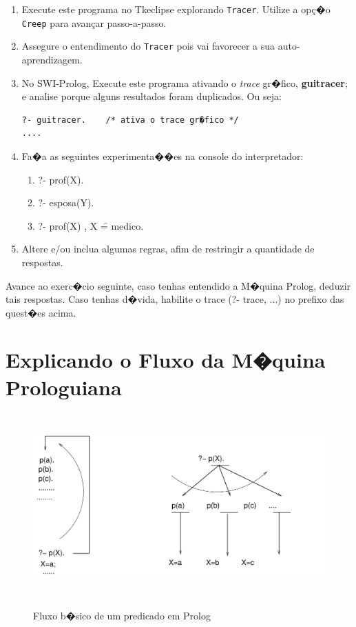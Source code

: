 \documentclass[final,a4paper]{article}
\begin{document}
\begin{enumerate}

\item Execute este programa no Tkeclipse explorando 
\texttt{Tracer}. Utilize a op\c{c}�o \texttt{Creep}
para avan\c{c}ar passo-a-passo.

\item Assegure o entendimento do \texttt{Tracer} pois
vai favorecer a sua auto-aprendizagem.

\item No SWI-Prolog, Execute este programa ativando
o {\em trace} gr�fico, {\bf guitracer}; e analise
porque alguns resultados foram duplicados.
Ou seja:
\begin{verbatim}
?- guitracer.    /* ativa o trace gr�fico */
....
\end{verbatim}

\item Fa�a as seguintes experimenta��es na
console do interpretador:
\begin{enumerate}
\item ?- prof(X).
\item ?- esposa(Y).
\item ?- prof(X) , X \== medico.
\end{enumerate}

\item Altere e/ou inclua algumas regras,
afim de restringir a quantidade de respostas.

\end{enumerate}

Avance ao exerc�cio seguinte, caso  tenhas
entendido  a M�quina Prolog, deduzir
tais respostas. Caso tenhas d�vida, habilite o
trace (?- trace, ...) no prefixo das quest�es acima.

\section{Explicando o Fluxo da M�quina Prologuiana}



\begin{figure}[!htb]
\centering
\includegraphics[width=12cm, height=7cm]{figuras/fluxo_px.pdf}
\label{fig_fluxo_px}
\caption{Fluxo b�sico de um predicado em Prolog}
\end{figure}
\end{document}
